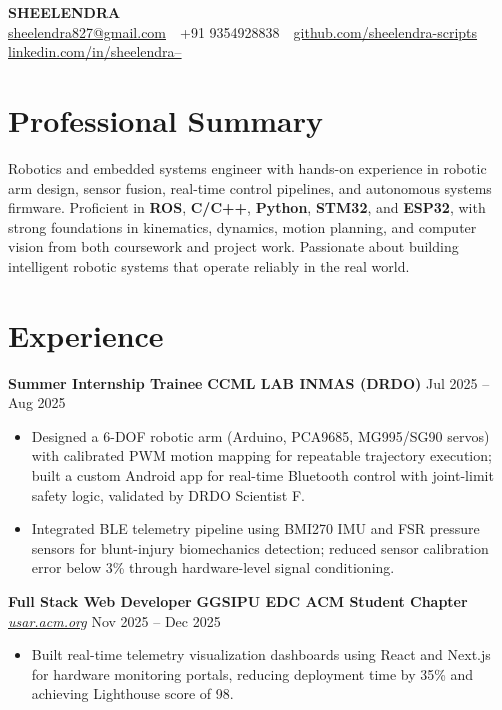 \documentclass[10pt,letterpaper]{article}
\begin{document}
\begin{center}
{\fontsize{18}{20}\selectfont \textbf{SHEELENDRA}}\\
\vspace{2pt}
\small
\href{mailto:sheelendra827@gmail.com}{sheelendra827@gmail.com}
\,\textbar{}\,
+91 9354928838
\,\textbar{}\,
\href{https://github.com/sheelendra-scripts}{github.com/sheelendra-scripts}
\,\textbar{}\,
\href{https://linkedin.com/in/sheelendra--}{linkedin.com/in/sheelendra--}
\end{center}

\vspace{1pt}

\section*{Professional Summary}

Robotics and embedded systems engineer with hands-on experience in robotic arm design, sensor fusion, real-time control pipelines, and autonomous systems firmware. Proficient in \textbf{ROS}, \textbf{C/C++}, \textbf{Python}, \textbf{STM32}, and \textbf{ESP32}, with strong foundations in kinematics, dynamics, motion planning, and computer vision from both coursework and project work. Passionate about building intelligent robotic systems that operate reliably in the real world.

\section*{Experience}

\textbf{Summer Internship Trainee} \textbar{} \textbf{CCML LAB \textbar{} INMAS (DRDO)} \hfill Jul 2025 -- Aug 2025
\begin{itemize}
    \item Designed a 6-DOF robotic arm (Arduino, PCA9685, MG995/SG90 servos) with calibrated PWM motion mapping for repeatable trajectory execution; built a custom Android app for real-time Bluetooth control with joint-limit safety logic, validated by DRDO Scientist F.
    \item Integrated BLE telemetry pipeline using BMI270 IMU and FSR pressure sensors for blunt-injury biomechanics detection; reduced sensor calibration error below 3\% through hardware-level signal conditioning.
\end{itemize}

\vspace{1pt}

\textbf{Full Stack Web Developer} \textbar{} \textbf{GGSIPU EDC ACM Student Chapter} \textbar{} \textit{\href{https://usar.acm.org}{usar.acm.org}} \hfill Nov 2025 -- Dec 2025
\begin{itemize}
    \item Built real-time telemetry visualization dashboards using React and Next.js for hardware monitoring portals, reducing deployment time by 35\% and achieving Lighthouse score of 98.
\end{itemize}
\end{document}
